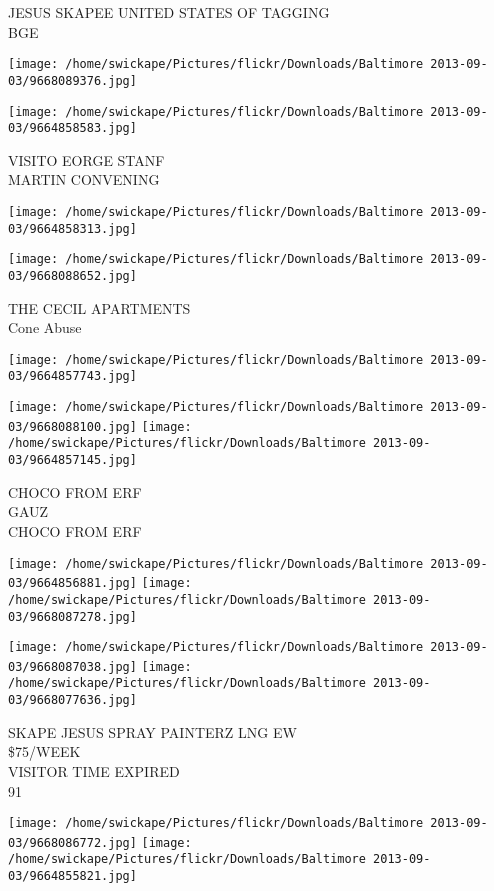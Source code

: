 \documentclass[10pt,letterpaper]{article}
\begin{document}
JESUS SKAPEE UNITED STATES OF TAGGING\\
BGE
\pagebreak

\texttt{[image: /home/swickape/Pictures/flickr/Downloads/Baltimore 2013-09-03/9668089376.jpg]}

\vspace{0.25in}
\texttt{[image: /home/swickape/Pictures/flickr/Downloads/Baltimore 2013-09-03/9664858583.jpg]}

VISITO EORGE STANF\\
MARTIN CONVENING
\pagebreak

\texttt{[image: /home/swickape/Pictures/flickr/Downloads/Baltimore 2013-09-03/9664858313.jpg]}

\vspace{0.25in}
\texttt{[image: /home/swickape/Pictures/flickr/Downloads/Baltimore 2013-09-03/9668088652.jpg]}

THE CECIL APARTMENTS\\
Cone Abuse
\pagebreak

\texttt{[image: /home/swickape/Pictures/flickr/Downloads/Baltimore 2013-09-03/9664857743.jpg]}

\vspace{0.25in}
\texttt{[image: /home/swickape/Pictures/flickr/Downloads/Baltimore 2013-09-03/9668088100.jpg]}
\texttt{[image: /home/swickape/Pictures/flickr/Downloads/Baltimore 2013-09-03/9664857145.jpg]}

CHOCO FROM ERF\\
GAUZ\\
CHOCO FROM ERF
\pagebreak

\texttt{[image: /home/swickape/Pictures/flickr/Downloads/Baltimore 2013-09-03/9664856881.jpg]}
\texttt{[image: /home/swickape/Pictures/flickr/Downloads/Baltimore 2013-09-03/9668087278.jpg]}

\texttt{[image: /home/swickape/Pictures/flickr/Downloads/Baltimore 2013-09-03/9668087038.jpg]}
\texttt{[image: /home/swickape/Pictures/flickr/Downloads/Baltimore 2013-09-03/9668077636.jpg]}

SKAPE JESUS SPRAY PAINTERZ LNG EW\\
\$75/WEEK\\
VISITOR TIME EXPIRED\\
91
\pagebreak

\texttt{[image: /home/swickape/Pictures/flickr/Downloads/Baltimore 2013-09-03/9668086772.jpg]}
\texttt{[image: /home/swickape/Pictures/flickr/Downloads/Baltimore 2013-09-03/9664855821.jpg]}
\end{document}
